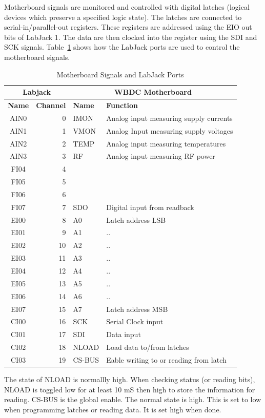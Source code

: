 \documentclass[letterpaper,11pt]{book}
\begin{document}
Motherboard signals are monitored and controlled with 
digital latches (logical devices which preserve a specified logic state). 
The latches are connected to
serial-in/parallel-out registers.  These registers are addressed using the EIO
out bits of LabJack 1.  The data are then clocked into the register using
the SDI and SCK signals.  Table~\ref{tab:signals} shows how the LabJack ports 
are used to control the motherboard signals.
\begin{table}[h!tb]
  \begin{center}
    \caption{\label{tab:signals}Motherboard Signals and LabJack Ports}
    \begin{tabular}{|c|r|l|l|}
    \hline
    \multicolumn{2}{|c|}{\bf Labjack} & \multicolumn{2}{c|}{\bf WBDC Motherboard} \\
    \hline
     {\bf Name} & {\bf Channel} & {\bf Name}  & {\bf Function} \\
    \hline
      AIN0  &   0    & IMON &  Analog input measuring supply currents \\
      AIN1  &   1    & VMON &  Analog Input measuring supply voltages \\
      AIN2  &   2    & TEMP &  Analog input measuring temperatures \\
      AIN3  &   3    & RF   &  Analog input measuring RF power \\
      FI04  &   4    &      & \\
      FI05  &   5    &      & \\
      FI06  &   6    &      & \\
      FI07  &   7    & SDO  &  Digital input from readback \\
   \hline
      EI00  &   8    & A0   &      Latch address LSB \\
      EI01  &   9    & A1   &      .. \\
      EI02  &  10    & A2   &      .. \\
      EI03  &  11    & A3   &      .. \\
      EI04  &  12    & A4   &      .. \\
      EI05  &  13    & A5   &      .. \\
      EI06  &  14    & A6   &      .. \\
      EI07  &  15    & A7   &      Latch address MSB \\
    \hline
      CI00  &  16    & SCK     &   Serial Clock input \\
      CI01  &  17    & SDI     &   Data input \\
      CI02  &  18    & NLOAD   &   Load data to/from latches \\
      CI03  &  19    & CS-BUS  &   Eable writing to or reading from latch \\
    \hline  
    \end{tabular}
  \end{center}
\end{table}
The state of NLOAD is normallly high. When checking status (or reading bits),
NLOAD is toggled low for at least 10 mS then high to store the information for
reading.
CS-BUS is the global enable. The normal state is high. This is set to low when
programming latches or reading data. It is set high when done.
\end{document}

